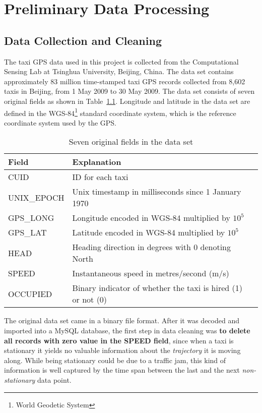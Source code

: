 \chapter{Preliminary Data Processing}\label{Chap:2}
\section{Data Collection and Cleaning}
The taxi GPS data used in this project is collected from the Computational Sensing Lab \cite{BPLL13} at Tsinghua University, Beijing, China. The data set contains approximately 83 million time-stamped taxi GPS records collected from 8,602 taxis in Beijing, from 1 May 2009 to 30 May 2009. The data set consists of seven original fields as shown in Table~\ref{Ta:orig_field}. Longitude and latitude in the data set are defined in the WGS-84\footnote{World Geodetic System} standard coordinate system, which is the reference coordinate system used by the GPS.

\begin{table}[h!]
\centering
\begin{tabular}{ | l | l | l | }
\hline
\textbf{Field} & \textbf{Explanation} \\ \hline
CUID & ID for each taxi \\ \hline
UNIX\_EPOCH & Unix timestamp in milliseconds since 1 January 1970\\ \hline
GPS\_LONG & Longitude encoded in WGS-84 multiplied by $10^{5}$\\ \hline
GPS\_LAT & Latitude encoded in WGS-84 multiplied by $10^{5}$ \\ \hline
HEAD & Heading direction in degrees with 0 denoting North\\ \hline
SPEED & Instantaneous speed in metres/second (m/s)\\ \hline
OCCUPIED & Binary indicator of whether the taxi is hired (1) or not (0)\\ \hline
\end{tabular}
\caption{Seven original fields in the data set}\label{Ta:orig_field}
\end{table}

The original data set came in a binary file format. After it was decoded and imported into a MySQL database, the first step in data cleaning was \textbf{to delete all records with zero value in the SPEED field}, since when a taxi is stationary it yields no valuable information about the \emph{trajectory} it is moving along. While being stationary could be due to a traffic jam, this kind of information is well captured by the time span between the last and the next \emph{non-stationary} data point. 

